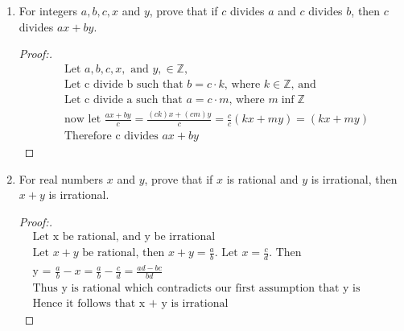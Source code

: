 \documentclass[11pt]{article}
\begin{document}
\begin{enumerate}
\begin{proof}[Proof:\nopunct]
           Therefore for any integer $n = 3k,$ $ n = 3k+1, \text{ or }n=3k+2$, $n$ is divisible by 3.
            
        \end{proof}
        
    \item For integers $a,b,c,x$ and $y$, prove that if $c$ divides $a$ and $c$ divides $b$, then $c$ divides $ax+by$.
        \begin{proof}[Proof:\nopunct]
        \begin{align*}
            & \text{Let $a,b,c,x,  \text{ and } y, \in \mathbb{Z}$,} \\
            & \text{Let c divide b such that $b=c \cdot k$, where $k \in \mathbb{Z}$, and} \\
            & \text{Let c divide a such that $a=c \cdot m$, where $m \inf \mathbb{Z}$} \\
            & \text{now let $\frac{ax+by}{c}=\frac{(ck)x+(cm)y}{c}=\frac{c}{c}(kx+my)=(kx+my)$} \\
            & \text{Therefore c divides $ax+by$}
        \end{align*}
        \end{proof}
        
    \item For real numbers $x$ and $y$, prove that if $x$ is rational and $y$ is irrational, then $x + y$ is irrational. 
        \begin{proof}[Proof:\nopunct]
            \begin{align*}
                &\text{Let x be rational, and y be irrational} \\
                & \text{Let $x+y$} \text{ be rational, then $x+y=\frac{a}{b}$. Let $x=\frac{c}{d}$. Then} \\
                & \text{y = $\frac{a}{b} - x=\frac{a}{b}-\frac{c}{d}=\frac{ad-bc}{bd}$} \\
                & \text{Thus y is rational which contradicts our first assumption that y is irrational.} \\ & \text{Hence it follows that x + y is irrational}
            \end{align*}
        \end{proof}
        

\end{enumerate}
\end{document}
